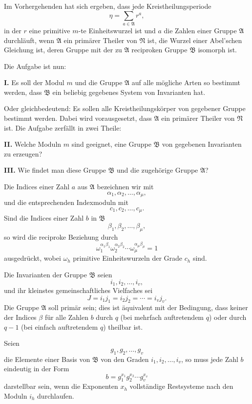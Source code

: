 \documentclass[11pt]{article}
\providecommand{\grpA}{\mathfrak A}
\providecommand{\grpB}{\mathfrak B}
\providecommand{\grpN}{\mathfrak N}
\begin{document}
Im Vorhergehenden hat sich ergeben, dass jede Kreistheilungsperiode
\[
 \eta=\sum_{a\in\grpA}r^a,
\]
in der $r$ eine primitive $m$-te Einheitswurzel ist und $a$ die Zahlen einer Gruppe $\grpA$ durchläuft, wenn $\grpA$ ein primärer Theiler von $\grpN$ ist, die Wurzel einer Abel'schen Gleichung ist, deren Gruppe mit der zu $\grpA$ reciproken Gruppe $\grpB$ isomorph ist.

Die Aufgabe ist nun:

\medskip
\noindent\textbf{I.} Es soll der Modul $m$ und die Gruppe $\grpA$ auf alle mögliche Arten so bestimmt werden, dass $\grpB$ ein beliebig gegebenes System von Invarianten hat.

Oder gleichbedeutend: Es sollen alle Kreistheilungskörper von gegebener Gruppe bestimmt werden. Dabei wird vorausgesetzt, dass $\grpA$ ein primärer Theiler von $\grpN$ ist. Die Aufgabe zerfällt in zwei Theile:

\medskip
\noindent\textbf{II.} Welche Moduln $m$ sind geeignet, eine Gruppe $\grpB$ von gegebenen Invarianten zu erzeugen?

\noindent\textbf{III.} Wie findet man diese Gruppe $\grpB$ und die zugehörige Gruppe $\grpA$?

Die Indices einer Zahl $a$ aus $\grpA$ bezeichnen wir mit
\[
 \alpha_1,\alpha_2,
\ldots,\alpha_\mu,
\]
und die entsprechenden Indexmoduln mit
\[
 c_1,c_2,
\ldots,c_\mu.
\]
Sind die Indices einer Zahl $b$ in $\grpB$
\[
 \beta_1,\beta_2,
\ldots,\beta_\mu,
\]
so wird die reciproke Beziehung durch
\begin{equation}
 \omega_1^{\alpha_1\beta_1}\omega_2^{\alpha_2\beta_2}
 \cdots\omega_\mu^{\alpha_\mu\beta_\mu}=1
\tag{1}
\end{equation}
ausgedrückt, wobei $\omega_h$ primitive Einheitswurzeln der Grade $c_h$ sind.

Die Invarianten der Gruppe $\grpB$ seien
\[
 i_1,i_2,
\ldots,i_v,
\]
und ihr kleinstes gemeinschaftliches Vielfaches sei
\begin{equation}
 J=i_1j_1=i_2j_2=\cdots=i_vj_v.
\tag{2}
\end{equation}
Die Gruppe $\grpA$ soll primär sein; dies ist äquivalent mit der Bedingung, dass keiner der Indices $\beta$ für alle Zahlen $b$ durch $q$ (bei mehrfach auftretendem $q$) oder durch $q-1$ (bei einfach auftretendem $q$) theilbar ist.

Seien
\[
 g_1,g_2,
\ldots,g_v
\]
die Elemente einer Basis von $\grpB$ von den Graden $i_1,i_2,
\ldots,i_v$, so muss jede Zahl $b$ eindeutig in der Form
\begin{equation}
 b=g_1^{x_1}g_2^{x_2}\cdots g_v^{x_v}
\tag{3}
\end{equation}
darstellbar sein, wenn die Exponenten $x_h$ vollständige Restsysteme nach den Moduln $i_h$ durchlaufen.
\end{document}
